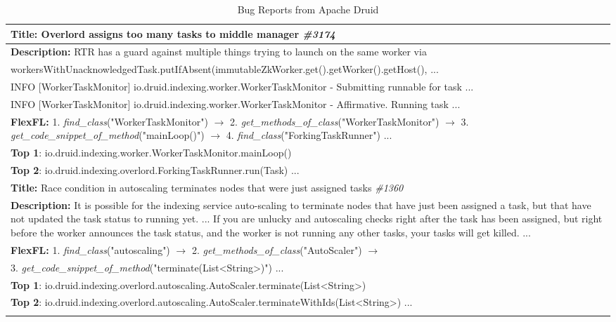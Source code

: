 \vspace{-0.5em}
\begin{table}[h] \small
\centering
\caption{Bug Reports from Apache Druid} \label{tab:example}
\vspace{-8pt}
\begin{tabularx}{\textwidth}{X}
\Xhline{1.0pt}
\textbf{Title:} Overlord assigns too many tasks to middle manager \textit{\#3174} \\\hline
\textbf{Description:} RTR has a guard against multiple things trying to launch on the same worker via \\
workersWithUnacknowledgedTask.putIfAbsent(immutableZkWorker.get().getWorker().getHost(), ...\\
INFO [WorkerTaskMonitor] io.druid.indexing.worker.WorkerTaskMonitor - Submitting runnable for task ... \\
INFO [WorkerTaskMonitor] io.druid.indexing.worker.WorkerTaskMonitor - Affirmative. Running task ... \\ \hline
\textbf{FlexFL:} 1. \textit{find\_class}("WorkerTaskMonitor") $\rightarrow$ 2. \textit{get\_methods\_of\_class}("WorkerTaskMonitor") $\rightarrow$ 3. \textit{get\_code\_snippet\_of\_method}("mainLoop()") $\rightarrow$ 4. \textit{find\_class}("ForkingTaskRunner") ...\\[5pt]
\textbf{Top 1}: io.druid.indexing.worker.WorkerTaskMonitor.mainLoop() \\
\textbf{Top 2}: io.druid.indexing.overlord.ForkingTaskRunner.run(Task) ... \\
\Xhline{1.0pt}
\textbf{Title:} Race condition in autoscaling terminates nodes that were just assigned tasks \textit{\#1360}\\ \hline
\textbf{Description:} It is possible for the indexing service auto-scaling to terminate nodes that have just been assigned a task, but that have not updated the task status to running yet.
... If you are unlucky and autoscaling checks right after the task has been assigned, but right before the worker announces the task status, and the worker is not running any other tasks, your tasks will get killed. ...\\ \hline
\textbf{FlexFL:} 1. \textit{find\_class}("autoscaling") $\rightarrow$ 2. \textit{get\_methods\_of\_class}("AutoScaler") $\rightarrow$ \\ 3. \textit{get\_code\_snippet\_of\_method}("terminate(List<String>)") ...\\
\textbf{Top 1}: io.druid.indexing.overlord.autoscaling.AutoScaler.terminate(List<String>) \\
\textbf{Top 2}: io.druid.indexing.overlord.autoscaling.AutoScaler.terminateWithIds(List<String>) ... \\
\Xhline{1.0pt}
\end{tabularx}
\end{table}
\vspace{-0.5em}

